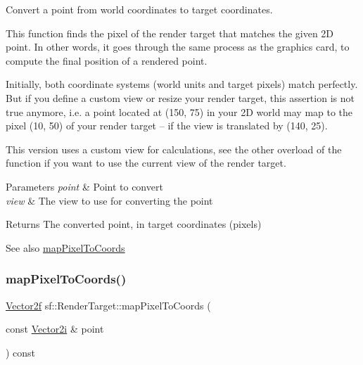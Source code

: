 Convert a point from world coordinates to target coordinates. 

This function finds the pixel of the render target that matches the given 2D point. In other words, it goes through the same process as the graphics card, to compute the final position of a rendered point.

Initially, both coordinate systems (world units and target pixels) match perfectly. But if you define a custom view or resize your render target, this assertion is not true anymore, i.\+e. a point located at (150, 75) in your 2D world may map to the pixel (10, 50) of your render target -- if the view is translated by (140, 25).

This version uses a custom view for calculations, see the other overload of the function if you want to use the current view of the render target.


\begin{DoxyParams}{Parameters}
{\em point} & Point to convert \\
\hline
{\em view} & The view to use for converting the point\\
\hline
\end{DoxyParams}
\begin{DoxyReturn}{Returns}
The converted point, in target coordinates (pixels)
\end{DoxyReturn}
\begin{DoxySeeAlso}{See also}
\mbox{\hyperlink{classsf_1_1_render_target_a0103ebebafa43a97e6e6414f8560d5e3}{map\+Pixel\+To\+Coords}} \begin{DoxyVerb}\end{DoxyVerb}
 
\end{DoxySeeAlso}
\mbox{\label{classsf_1_1_render_target_a0103ebebafa43a97e6e6414f8560d5e3}} 
\subsubsection{\texorpdfstring{mapPixelToCoords()}{mapPixelToCoords()}\hspace{0.1cm}{\footnotesize\ttfamily [1/2]}}
{\footnotesize\ttfamily \mbox{\hyperlink{classsf_1_1_vector2}{Vector2f}} sf\+::\+Render\+Target\+::map\+Pixel\+To\+Coords (\begin{DoxyParamCaption}\item[{const \mbox{\hyperlink{classsf_1_1_vector2}{Vector2i}} \&}]{point }\end{DoxyParamCaption}) const}




